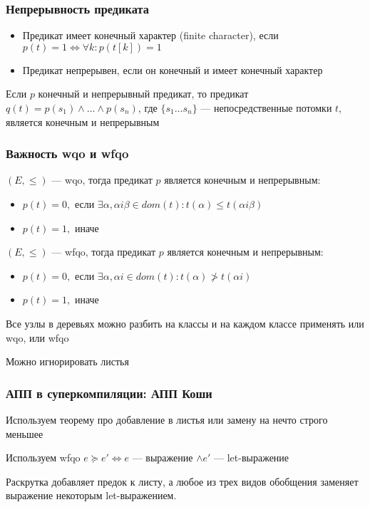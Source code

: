 \documentclass{beamer}
\def\iff{\Leftrightarrow}
\begin{document}
\begin{frame}[fragile]
  \transwipe[direction=90]
  \frametitle{Непрерывность предиката}

  \begin{itemize}
    \item Предикат имеет конечный характер (finite character), если $p(t) = 1 \iff \forall k : p(t[k]) = 1$
    \item Предикат непрерывен, если он конечный и имеет конечный характер 
  \end{itemize}

\vfill
  
  Если $p$ конечный и непрерывный предикат, то предикат $q(t) = p(s_1) \wedge \dots \wedge p(s_n)$, где $\{ s_1 \dots s_n \}$ --- непосредственные потомки $t$, является конечным и непрерывным 
\end{frame}

\begin{frame}[fragile]
  \transwipe[direction=90]
  \frametitle{Важность wqo и wfqo}
$(E, \leq)$ --- wqo, тогда предикат $p$ является конечным и непрерывным:

\begin{itemize}
  \item $p(t) = 0,$ если  $\exists \alpha, \alpha i \beta \in dom(t): t(\alpha) \leq t(\alpha i \beta)$
  \item $p(t) = 1,$ иначе
\end{itemize}

\vfill 

$(E, \leq)$ --- wfqo, тогда предикат $p$ является конечным и непрерывным:

\begin{itemize}
  \item $p(t) = 0,$ если  $\exists \alpha, \alpha i \in dom(t): t(\alpha) \ngtr t(\alpha i)$
  \item $p(t) = 1,$ иначе
\end{itemize}

\vfill 

Все узлы в деревьях можно разбить на классы и на каждом классе применять или wqo, или wfqo 

\vfill 

Можно игнорировать листья 

\end{frame}

\begin{frame}[fragile]
  \transwipe[direction=90]
  \frametitle{АПП в суперкомпиляции: АПП Коши}

  Используем теорему про добавление в листья или замену на нечто строго меньшее

  \vfill 

  Используем wfqo $e \succcurlyeq e' \iff e$ --- выражение $\wedge e'$ --- let-выражение 

  \vfill 

  Раскрутка добавляет предок к листу, а любое из трех видов обобщения заменяет выражение некоторым let-выражением. 
\end{frame}
\end{document}
